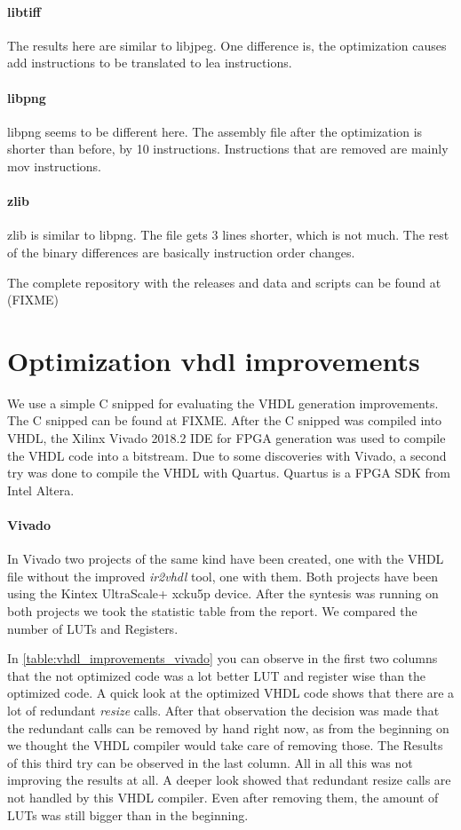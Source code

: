 \paragraph{libtiff} The results here are similar to libjpeg. One difference is, the optimization causes add instructions to be translated to lea instructions. 

\paragraph{libpng} libpng seems to be different here. The assembly file after the optimization is shorter than before, by 10 instructions. Instructions that are removed are mainly mov instructions.

\paragraph{zlib} zlib is similar to libpng. The file gets 3 lines shorter, which is not much. The rest of the binary differences are basically instruction order changes.

The complete repository with the releases and data and scripts can be found at (FIXME)

\section{Optimization vhdl improvements}

We use a simple C snipped for evaluating the VHDL generation improvements. The C snipped can be found at FIXME. After the C snipped was compiled into VHDL, the Xilinx Vivado 2018.2 IDE for FPGA generation was used to compile the VHDL code into a bitstream. Due to some discoveries with Vivado, a second try was done to compile the VHDL with Quartus. Quartus is a FPGA SDK from Intel Altera.

\paragraph{Vivado}
In Vivado two projects of the same kind have been created, one with the VHDL file without the improved \textit{ir2vhdl} tool, one with them. Both projects have been using the Kintex UltraScale+ xcku5p device. After the syntesis was running on both projects we took the statistic table from the report. We compared the number of LUTs and Registers. 

In \autoref{table:vhdl_improvements_vivado} you can observe in the first two columns that the not optimized code was a lot better LUT and register wise than the optimized code. A quick look at the optimized VHDL code shows that there are a lot of redundant \textit{resize} calls. After that observation the decision was made that the redundant calls can be removed by hand right now, as from the beginning on we thought the VHDL compiler would take care of removing those. The Results of this third try can be observed in the last column.
All in all this was not improving the results at all. A deeper look showed that redundant resize calls are not handled by this VHDL compiler. Even after removing them, the amount of LUTs was still bigger than in the beginning.

